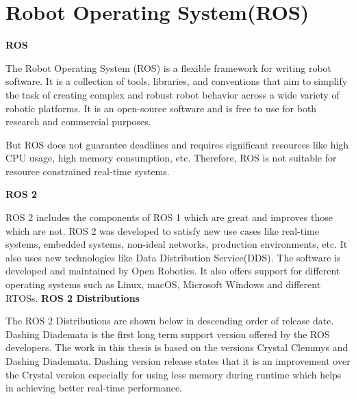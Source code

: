 \documentclass[%
xelatex,
	oneside,		%
	12pt,			%
	parskip=half,	%
	abstracton,
	chapterprefix=true%
    appendixprefix=true]
{scrbook}
\begin{document}
	 \section{Robot Operating System(ROS)}
	 {\bfseries ROS}
	 
The Robot Operating System (ROS) is a flexible framework for writing robot software. It is a collection of tools, libraries, and conventions that aim to simplify the task of creating complex and robust robot behavior across a wide variety of robotic platforms.\cite{ROS}	
It is an open-source software and is free to use for both research and commercial purposes.
 
But ROS does not guarantee deadlines and requires significant resources like high CPU usage, high memory consumption, etc. Therefore, ROS is not suitable for resource constrained real-time systems.

{\bfseries	 ROS 2}

ROS 2 includes the components of ROS 1 which are great and improves those which are not.	ROS 2 was developed to satisfy new use cases like real-time systems, embedded systems, non-ideal networks, production environments, etc. It also uses new technologies like Data Distribution Service(DDS). The software is developed and maintained by Open Robotics.
It also offers support for different operating systems such as Linux, macOS, Microsoft Windows and different RTOSs. 
	 \clearpage
{\bfseries	 ROS 2 Distributions}
	 

The ROS 2 Distributions are shown below in descending order of release date. Dashing Diademata is the first long term support version offered by the ROS developers. The work in this thesis is based on the versions Crystal Clemmys and Dashing Diademata. Dashing version release states that it is an improvement over the Crystal version especially for using less memory during runtime which helps in achieving better real-time performance. 

 
 
\end{document}
